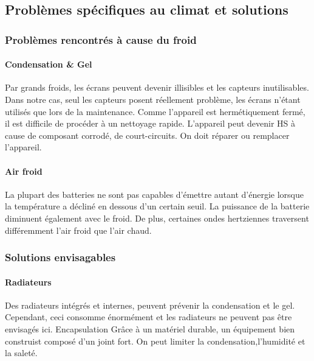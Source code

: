 \subsection{Problèmes spécifiques au climat et solutions}

\subsubsection{Problèmes rencontrés à cause du froid}

\paragraph{Condensation \&  Gel}

Par grands froids, les écrans peuvent devenir illisibles et les capteurs inutilisables. Dans notre cas, seul les capteurs posent réellement problème, les écrans n'étant utilisés que lors de la maintenance.
Comme l’appareil est hermétiquement fermé, il est difficile de procéder à un nettoyage rapide. L’appareil peut devenir HS à cause de composant corrodé, de court-circuits. On doit réparer ou remplacer l’appareil.

\paragraph{Air froid}

La plupart des batteries ne sont pas capables d’émettre autant d'énergie lorsque la température a décliné en dessous d'un certain seuil. La puissance de la batterie diminuent également avec le froid.
De plus, certaines ondes hertziennes traversent différemment l’air froid que l’air chaud\footnotemark.


\subsubsection{Solutions envisagables}

\paragraph{Radiateurs}

Des radiateurs intégrés et internes, peuvent prévenir la condensation et le gel. Cependant, ceci consomme énormément et les radiateurs ne peuvent pas être envisagés ici.
Encapsulation
Grâce à un matériel durable, un équipement bien construist composé d’un joint fort. On peut limiter la condensation,l’humidité et la saleté.


